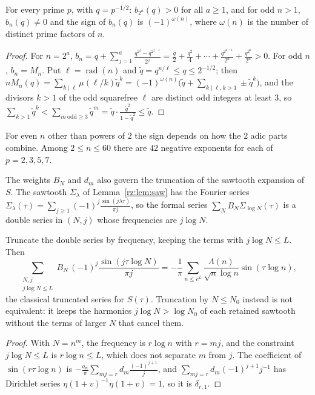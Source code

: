 \begin{proposition}\label{rz:prop:signs}
For every prime $p$, with $q=p^{-1/2}$: $b_{2^a}(q)>0$ for all $a\ge1$, and for odd $n>1$, $b_n(q)\ne0$ and the sign of $b_n(q)$ is $(-1)^{\omega(n)}$, where $\omega(n)$ is the number of distinct prime factors of $n$.
\end{proposition}

\begin{proof}
For $n=2^a$, $b_n=q+\sum_{j=1}^a\frac{q^{2^j}-q^{2^{j-1}}}{2^j}=\frac q2+\frac{q^2}4+\cdots+\frac{q^{2^{a-1}}}{2^a}+\frac{q^{2^a}}{2^a}>0$. For odd $n$, $b_n=M_n$. Put $\ell=\operatorname{rad}(n)$ and $\tilde q=q^{n/\ell}\le q\le2^{-1/2}$; then $nM_n(q)=\sum_{k\mid\ell}\mu(\ell/k)\tilde q^k=(-1)^{\omega(n)}\bigl(\tilde q+\sum_{k\mid\ell,k>1}\pm\tilde q^k\bigr)$, and the divisors $k>1$ of the odd squarefree $\ell$ are distinct odd integers at least $3$, so $\sum_{k>1}\tilde q^k<\sum_{m\ \mathrm{odd}\ge3}\tilde q^m=\tilde q\cdot\frac{\tilde q^2}{1-\tilde q^2}\le\tilde q$.
\end{proof}

For even $n$ other than powers of $2$ the sign depends on how the $2$ adic parts combine. Among $2\le n\le60$ there are $42$ negative exponents for each of $p=2,3,5,7$.

The weights $B_N$ and $d_m$ also govern the truncation of the sawtooth expansion of $S$. The sawtooth $\Sigma_\lambda$ of Lemma~\ref{rz:lem:saw} has the Fourier series $\Sigma_\lambda(\tau)=\sum_{j\ge1}(-1)^j\frac{\sin(j\lambda\tau)}{\pi j}$, so the formal series $\sum_NB_N\Sigma_{\log N}(\tau)$ is a double series in $(N,j)$ whose frequencies are $j\log N$.

\begin{proposition}\label{rz:prop:sawtrunc}
Truncate the double series by frequency, keeping the terms with $j\log N\le L$. Then
\[
\sum_{\substack{N,j\\ j\log N\le L}}B_N\,(-1)^j\frac{\sin(j\tau\log N)}{\pi j}=-\frac1\pi\sum_{n\le e^L}\frac{\Lambda(n)}{\sqrt n\log n}\sin(\tau\log n),
\]
the classical truncated series for $S(\tau)$. Truncation by $N\le N_0$ instead is not equivalent: it keeps the harmonics $j\log N>\log N_0$ of each retained sawtooth without the terms of larger $N$ that cancel them.
\end{proposition}

\begin{proof}
With $N=n^m$, the frequency is $r\log n$ with $r=mj$, and the constraint $j\log N\le L$ is $r\log n\le L$, which does not separate $m$ from $j$. The coefficient of $\sin(r\tau\log n)$ is $-\frac{a_n}\pi\sum_{mj=r}d_m\frac{(-1)^{j+1}}j$, and $\sum_{mj=r}d_m(-1)^{j+1}j^{-1}$ has Dirichlet series $\eta(1+v)^{-1}\eta(1+v)=1$, so it is $\delta_{r,1}$.
\end{proof}

